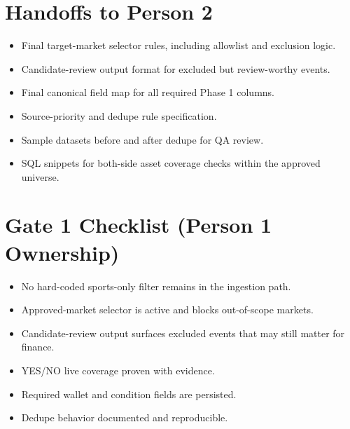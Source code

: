 \documentclass{article}
\begin{document}
\section*{Handoffs to Person 2}
\begin{itemize}
\item Final target-market selector rules, including allowlist and exclusion logic.
\item Candidate-review output format for excluded but review-worthy events.
\item Final canonical field map for all required Phase 1 columns.
\item Source-priority and dedupe rule specification.
\item Sample datasets before and after dedupe for QA review.
\item SQL snippets for both-side asset coverage checks within the approved universe.
\end{itemize}

\section*{Gate 1 Checklist (Person 1 Ownership)}
\begin{itemize}
\item No hard-coded sports-only filter remains in the ingestion path.
\item Approved-market selector is active and blocks out-of-scope markets.
\item Candidate-review output surfaces excluded events that may still matter for finance.
\item YES/NO live coverage proven with evidence.
\item Required wallet and condition fields are persisted.
\item Dedupe behavior documented and reproducible.
\end{itemize}
\end{document}
